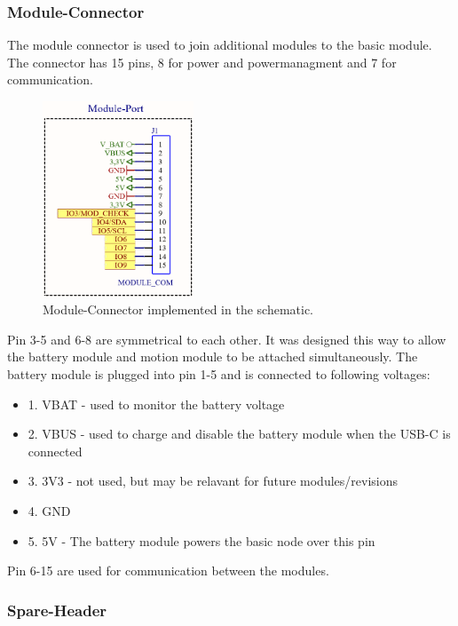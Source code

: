     \subsubsection{Module-Connector}

        The module connector is used to join additional modules to the basic module.
        The connector has 15 pins, 8 for power and powermanagment and 7 for 
        communication. 

    \begin{figure}[H]
        \centering
        \includegraphics[width=0.4\textwidth]{assets/HW/Node-Module-Connector.png}
        \caption{Module-Connector implemented in the schematic.}
    \end{figure}

        Pin 3-5 and 6-8 are symmetrical to each other. It was designed this way
        to allow the battery module and motion module to be attached simultaneously.
        The battery module is plugged into pin 1-5 and is connected to following 
        voltages:
    
    \begin{itemize}
        \item 1. VBAT - used to monitor the battery voltage
        \item 2. VBUS - used to charge and disable the battery module when the USB-C 
        is connected
        \item 3. 3V3 - not used, but may be relavant for future modules/revisions
        \item 4. GND
        \item 5. 5V - The battery module powers the basic node over this pin
    \end{itemize}

        Pin 6-15 are used for communication between the modules. 

    \subsubsection{Spare-Header}
            
